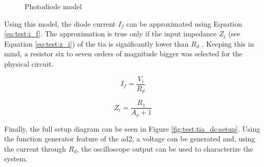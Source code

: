 \begin{figure}[ht]
	\centering
	\caption{Photodiode model}
	\label{fig:test:diode_equiv}
\end{figure}

Using this model, the diode current $I_f$ can be approximated using Equation \eqref{eq:test:i_f}. The approximation is true only if the input impedance $Z_i$ (see Equation \eqref{eq:test:z_i}) of the \gls{tia} is significantly lower than $R_d$ \cite{razavi2019transimpedance}. Keeping this in mind, a resistor six to seven orders of magnitude bigger was selected for the physical circuit.

\begin{equation}\label{eq:test:i_f}
	I_f = \frac{V_i}{R_d}
\end{equation}

\begin{equation}\label{eq:test:z_i}
	Z_i = \frac{R_1}{A_o + 1}
\end{equation}

Finally, the full setup diagram can be seen in Figure \ref{fig:test:tia_dc:setup}. Using the function generator feature of the \gls{ad2}, a voltage can be generated and, using the current through $R_d$, the oscilloscope output can be used to characterize the system.

